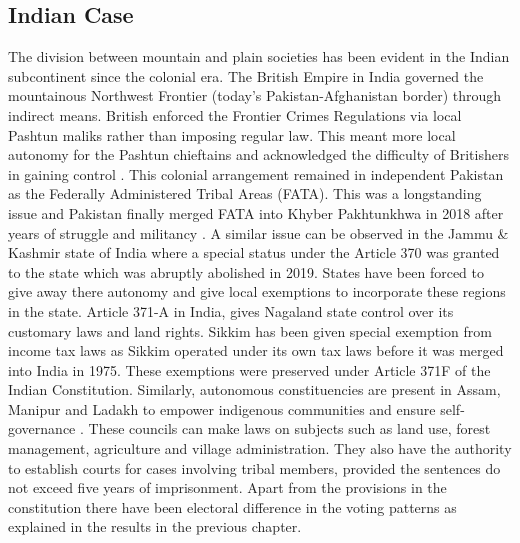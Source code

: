 \subsection{Indian Case}
The division between mountain and plain societies has been evident in the Indian subcontinent since the colonial era. The British Empire in India governed the mountainous Northwest Frontier (today’s Pakistan-Afghanistan border) through indirect means. British enforced the Frontier Crimes Regulations via local Pashtun maliks rather than imposing regular law. This meant more local autonomy for the Pashtun chieftains and acknowledged the difficulty of Britishers in gaining control \citep{ali2013indigenous}. This colonial arrangement remained in independent Pakistan as the Federally Administered Tribal Areas (FATA). This was a longstanding issue and  Pakistan finally merged FATA into Khyber Pakhtunkhwa in 2018 after years of struggle and militancy \citep{horgan2008leaving}. A similar issue can be observed in the Jammu \& Kashmir state of India where a special status under the Article 370 was granted to the state which was abruptly abolished in 2019. States have been forced to give away there autonomy and give local exemptions to incorporate these regions in the state. Article 371-A in India, gives Nagaland state control over its customary laws and land rights. Sikkim has been given special exemption from income tax laws as Sikkim operated under its own tax laws before it was merged into India in 1975. These exemptions were preserved under Article 371F of the Indian Constitution. Similarly, autonomous constituencies are present in  Assam, Manipur and Ladakh to empower indigenous communities and ensure self-governance \citep{sixthschedule}. These councils can make laws on subjects such as land use, forest management, agriculture and village administration. They also have the authority to establish courts for cases involving tribal members, provided the sentences do not exceed five years of imprisonment. Apart from the provisions in the constitution there have been electoral difference in the voting patterns as explained in the results in the previous chapter. 

